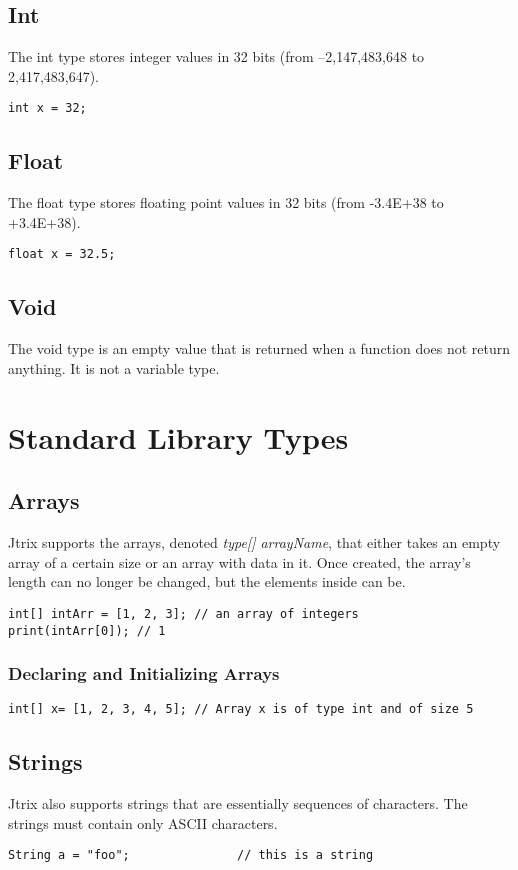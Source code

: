 \documentclass[12pt]{report}
\begin{document}
\subsection{Int}
The int type stores integer values in 32 bits (from --2,147,483,648 to 2,417,483,647).
\begin{lstlisting}
int x = 32;
\end{lstlisting}
\subsection{Float}
The float type stores floating point values in 32 bits (from -3.4E+38 to +3.4E+38).
\begin{lstlisting}
float x = 32.5;
\end{lstlisting}
\subsection{Void}
The void type is an empty value that is returned when a function does not return anything. It is not a variable type.

\section{Standard Library Types}
\subsection{Arrays}
Jtrix supports the arrays, denoted \textit{type[] arrayName}, that either takes an empty array of a certain size or an array with data in it. Once created, the array's length can no longer be changed, but the elements inside can be.
\begin{lstlisting}
int[] intArr = [1, 2, 3]; // an array of integers
print(intArr[0]); // 1
\end{lstlisting}
\subsubsection{Declaring and Initializing Arrays}
\begin{lstlisting}
int[] x= [1, 2, 3, 4, 5]; // Array x is of type int and of size 5
\end{lstlisting}
\subsection{Strings}
Jtrix also supports strings that are essentially sequences of characters. The strings must contain only ASCII characters.
\begin{lstlisting}
String a = "foo";				// this is a string
\end{lstlisting}
\end{document}
